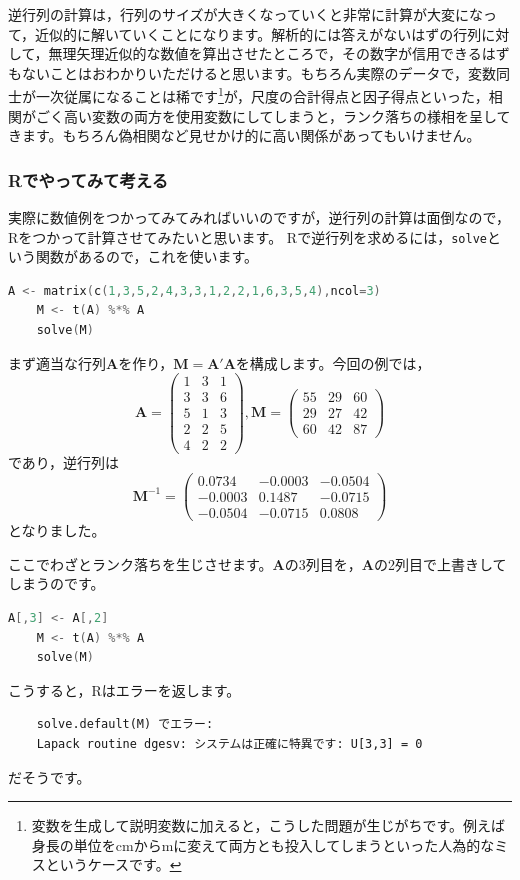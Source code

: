 \documentclass{ltjsbook}
\begin{document}
逆行列の計算は，行列のサイズが大きくなっていくと非常に計算が大変になって，近似的に解いていくことになります。解析的には答えがないはずの行列に対して，無理矢理近似的な数値を算出させたところで，その数字が信用できるはずもないことはおわかりいただけると思います。もちろん実際のデータで，変数同士が一次従属になることは稀です\footnote{変数を生成して説明変数に加えると，こうした問題が生じがちです。例えば身長の単位をcmからmに変えて両方とも投入してしまうといった人為的なミスというケースです。}が，尺度の合計得点と因子得点といった，相関がごく高い変数の両方を使用変数にしてしまうと，ランク落ちの様相を呈してきます。もちろん偽相関など見せかけ的に高い関係があってもいけません。

\subsubsection{Rでやってみて考える}
実際に数値例をつかってみてみればいいのですが，逆行列の計算は面倒なので，Rをつかって計算させてみたいと思います。
Rで逆行列を求めるには，\verb|solve|という関数があるので，これを使います。
\begin{lstlisting}[language=C++,label={Multico1},caption={フルランクの行列}]
    A <- matrix(c(1,3,5,2,4,3,3,1,2,2,1,6,3,5,4),ncol=3)
    M <- t(A) %*% A
    solve(M)
    \end{lstlisting}
まず適当な行列$\bm{A}$を作り，$\bm{M} = \bm{A}'\bm{A}$を構成します。今回の例では，
\[ \bm{A} = \begin{pmatrix}1 & 3 & 1\\ 3&3&6\\5&1&3\\2&2&5\\4&2&2\end{pmatrix},\bm{M} = \begin{pmatrix}55&29&60\\29&27&42\\60&42&87\end{pmatrix}\]
であり，逆行列は
\[ \bm{M}^{-1}=\begin{pmatrix} 0.0734 & -0.0003 & -0.0504\\-0.0003 & 0.1487 & -0.0715\\-0.0504&-0.0715&0.0808\end{pmatrix}\]
となりました。

ここでわざとランク落ちを生じさせます。$\bm{A}$の3列目を，$\bm{A}$の2列目で上書きしてしまうのです。
\begin{lstlisting}[language=C++,label={Multico2},caption={ランク落ちの行列}]
    A[,3] <- A[,2]
    M <- t(A) %*% A
    solve(M)
    \end{lstlisting}
こうすると，Rはエラーを返します。
\begin{verbatim}
    solve.default(M) でエラー: 
    Lapack routine dgesv: システムは正確に特異です: U[3,3] = 0 
    \end{verbatim}
だそうです。
\end{document}
